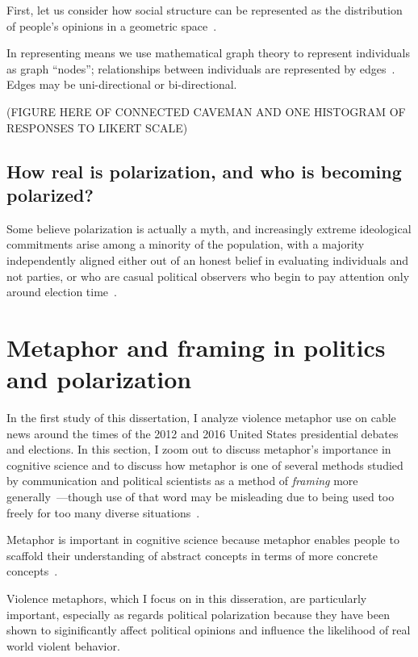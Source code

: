 \documentclass[12pt,letterpaper]{article}
\begin{document}
First, let us consider how social structure can be represented as
the distribution of people's opinions in a geometric space~\cite{Blau1974}.

In representing  means we use mathematical graph theory to represent 
individuals as graph ``nodes''; relationships between individuals
are represented by edges~\cite{Friedkin1998,Barabasi2016}. 
Edges may be uni-directional or bi-directional.


(FIGURE HERE OF CONNECTED CAVEMAN AND ONE HISTOGRAM OF RESPONSES TO LIKERT SCALE)

\subsection{How real is polarization, and who is becoming polarized?}

Some believe polarization is actually a myth, and increasingly 
extreme ideological commitments arise among a minority of the population,
with a majority independently aligned either out of an honest belief in 
evaluating individuals and not parties, or who are casual political
observers who begin to pay attention only around election time~\cite{Kinder2017}.

\section{Metaphor and framing in politics and polarization}

In the first study of this dissertation, I analyze violence metaphor use on
cable news around the times of the 2012 and 2016 United States presidential
debates and elections. In this section, I zoom out to discuss metaphor's
importance in cognitive science and to discuss how metaphor is one of several
methods studied by communication and political scientists as a method of
\emph{framing} more generally~\cite{Fillmore1982}---though use of that 
word may be misleading due to being used too freely for too many 
diverse situations~\cite{Cacciatore2016}.

Metaphor is important in cognitive science because metaphor enables people 
to scaffold their understanding of abstract concepts in terms of more concrete
concepts~\cite{Lakoff1980,Gibbs2011,Gibbs2012a,Kovecses2017}. 

Violence metaphors, which I focus on in this disseration, 
are particularly important, especially as regards political
polarization because they have been shown 
to siginificantly affect political opinions and influence the likelihood of
real world violent behavior. 
\end{document}
